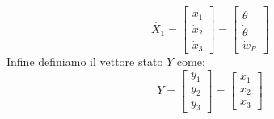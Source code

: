 \documentclass[12pt,a4paper,twoside, openright]{scrartcl}
\newcommand{\thetap}{\dot{\theta}}
\newcommand{\thetapp}{\ddot{\theta}}
\newcommand{\Xup}{\dot{X_1}}
\newcommand{\xu}{x_1}
\newcommand{\xd}{x_2}
\newcommand{\xt}{x_3}
\newcommand{\xup}{\dot{x}_1}
\newcommand{\xdp}{\dot{x}_2}
\newcommand{\xtp}{\dot{x}_3}
\newcommand{\yu}{y_1}
\newcommand{\yd}{y_2}
\newcommand{\yt}{y_3}
\begin{document}
\begin{equation}
	\label{eqn:11}
	\Xup =
	\begin{bmatrix}
		\xup \\
		\xdp \\
		\xtp
	\end{bmatrix}
	=
		\begin{bmatrix}
		\thetapp \\
		\thetap \\
		\dot{w}_R
	\end{bmatrix}
\end{equation}
Infine definiamo il vettore stato $Y$ come:
\begin{equation}
	\label{eqn:12}
	Y=
	\begin{bmatrix}
		\yu \\
		\yd \\
		\yt
	\end{bmatrix}
	=
	\begin{bmatrix}
		\xu \\
		\xd \\
		\xt
	\end{bmatrix}
\end{equation}	
\end{document}
